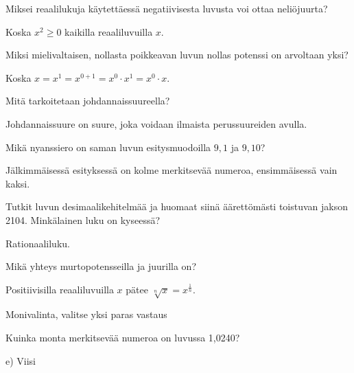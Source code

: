 \begin{tehtava}
Miksei reaalilukuja käytettäessä negatiivisesta luvusta voi ottaa neliöjuurta?
\begin{vastaus}
Koska $x^2 \geq 0$ kaikilla reaaliluvuilla $x$.
\end{vastaus}
\end{tehtava}

\begin{tehtava}
Miksi mielivaltaisen, nollasta poikkeavan luvun nollas potenssi on arvoltaan yksi?
\begin{vastaus}
Koska $x=x^1=x^{0+1}=x^0 \cdot x^1 = x^0 \cdot x$.
\end{vastaus}
\end{tehtava}

\begin{tehtava}
Mitä tarkoitetaan johdannaissuureella?
\begin{vastaus}
Johdannaissuure on suure, joka voidaan ilmaista perussuureiden avulla.
\end{vastaus}
\end{tehtava}

\begin{tehtava}
Mikä nyanssiero on saman luvun esitysmuodoilla $9,1$ ja $9,10$?
\begin{vastaus}
Jälkimmäisessä esityksessä on kolme merkitsevää numeroa, ensimmäisessä vain kaksi.
\end{vastaus}
\end{tehtava}

\begin{tehtava}
Tutkit luvun desimaalikehitelmää ja huomaat siinä äärettömästi toistuvan jakson 2104. Minkälainen luku on kyseessä?
\begin{vastaus}
Rationaaliluku.
\end{vastaus}
\end{tehtava}

\begin{tehtava}
Mikä yhteys murtopotensseilla ja juurilla on?
\begin{vastaus}
Positiivisilla reaaliluvuilla $x$ pätee $\sqrt[n]{x} = x^{\frac{1}{n}}$.
\end{vastaus}
\end{tehtava}

Monivalinta, valitse yksi paras vastaus
\begin{tehtava}
Kuinka monta merkitsevää numeroa on luvussa 1,0240?
\begin{alakohdat}
\end{alakohdat}
\begin{vastaus}
e) Viisi
\end{vastaus}
\end{tehtava}

